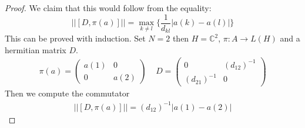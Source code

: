 \begin{proof}
    We claim that this would follow from the equality:
    \begin{equation}
        \big|\big|[D, \pi(a)]\big|\big| = \max_{k\neq l}
        \bigg\{\frac{1}{d_{kl}}\big|a(k) - a(l)\big|\bigg\}
        \label{induction}
    \end{equation}
    This can be proved with induction. Set $N=2$ then $H=\mathbb{C}^2$, $\pi:A\rightarrow L(H)$ and
    a hermitian matrix $D$.
    \begin{align}
        \pi(a) =
        \begin{pmatrix}
            a(1) & 0 \\
            0 & a(2)
        \end{pmatrix}
        \;\;\;\;
        D =
        \begin{pmatrix}
            0 & (d_{12})^{-1} \\
            (d_{21})^{-1} & 0
        \end{pmatrix}
    \end{align}
    Then we compute the commutator
    \begin{align}
        \big|\big|[D, \pi(a)]\big|\big| = (d_{12})^{-1} \big| a(1) - a(2)\big|
    \end{align}


\end{proof}
